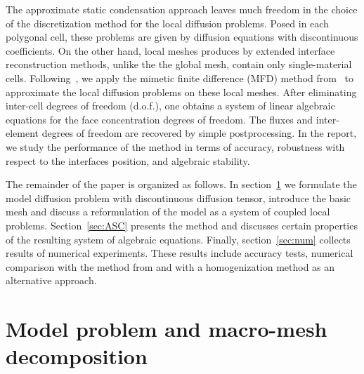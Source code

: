 \documentclass[12pt]{article}
\begin{document}
	The approximate static condensation approach leaves much freedom in the choice of the discretization method for the local diffusion problems.  Posed in each polygonal cell, these problems are given by diffusion equations with discontinuous coefficients. On the other hand, local meshes produces by extended interface reconstruction methods, unlike the the global mesh, contain only single-material cells. Following~\cite{kikinzon2017approximate}, we apply the mimetic finite difference (MFD) method from~\cite{lipnikov2014mimetic} to approximate the local diffusion problems on these local meshes.
	After eliminating inter-cell degrees of freedom (d.o.f.), one obtains a system of linear algebraic equations for the face concentration degrees of freedom. The fluxes and inter-element degrees of freedom are recovered by simple postprocessing. In the report, we study the performance of the method in terms of accuracy, robustness with respect to the interfaces position,  and algebraic stability.
	
	The remainder of the paper is organized as follows. In section~\ref{sec:model} we formulate the model diffusion problem with discontinuous diffusion tensor, introduce the basic mesh and discuss a reformulation of the model as a system of coupled local problems. Section~\ref{sec:ASC} presents the method and discusses certain  properties of the resulting  system of algebraic equations. Finally, section~\ref{sec:num} collects results of numerical experiments. These results include accuracy tests, numerical comparison with the method from  \cite{kikinzon2017approximate} and with a homogenization method as an alternative approach.
	
	\section{Model problem and macro-mesh decomposition} \label{sec:model}
	
\end{document}

